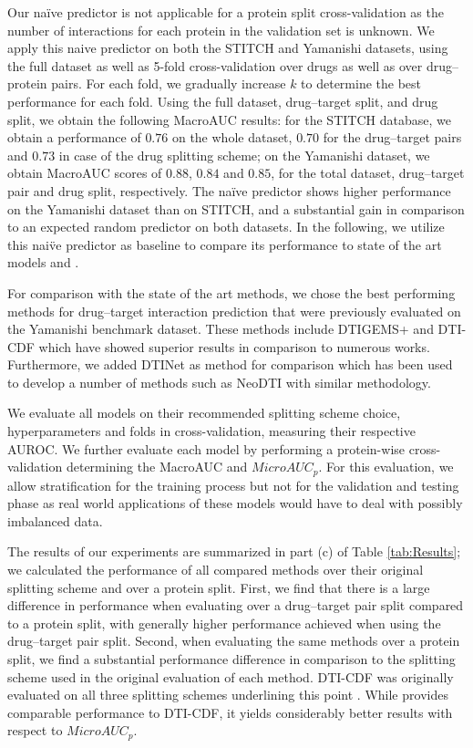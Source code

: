\documentclass{bioinfo}
\renewcommand{\cite}{\citep}
\begin{document}
Our na\"ive predictor is not applicable for a protein split
cross-validation as the number of interactions for each protein in the
validation set is unknown.  We apply this naive predictor on both the
STITCH and Yamanishi datasets, using the full dataset as well as
5-fold cross-validation over drugs as well as over drug--protein
pairs.  For each fold, we gradually increase $k$ to determine the best
performance for each fold. Using the full dataset, drug--target split,
and drug split, we obtain the following MacroAUC results: for the
STITCH database, we obtain a performance of $0.76$ on the whole
dataset, $0.70$ for the drug--target pairs and $0.73$ in case of the
drug splitting scheme; on the Yamanishi dataset, we obtain MacroAUC
scores of $0.88$, $0.84$ and $0.85$, for the total dataset,
drug--target pair and drug split, respectively.  The na\"ive predictor
shows higher performance on the Yamanishi dataset than on STITCH, and
a substantial gain in comparison to an expected random predictor on
both datasets. In the following, we utilize this nai\"ve predictor as
baseline to compare its performance to state of the art models and
\name.

For comparison with the state of the art methods, we chose the best
performing methods for drug--target interaction prediction that were
previously evaluated on the Yamanishi benchmark dataset. These methods
include DTIGEMS+ \cite{DTIGEMS2020} and DTI-CDF \cite{DTI-CDF2019}
which have showed superior results in comparison to numerous
works. Furthermore, we added DTINet \cite{DTINet2017} as method for
comparison which has been used to develop a number of methods such as
NeoDTI \cite{NeoDTI2019} with similar methodology.

We evaluate all models on their recommended splitting scheme choice,
hyperparameters and folds in cross-validation, measuring their
respective AUROC. We further evaluate each model by performing a
protein-wise cross-validation determining the MacroAUC and
$MicroAUC_p$. For this evaluation, we allow stratification for the
training process but not for the validation and testing phase as real
world applications of these models would have to deal with possibly
imbalanced data.

The results of our experiments are summarized in part (c) of Table
\ref{tab:Results}; we calculated the performance of all compared
methods over their original splitting scheme and over a protein
split. First, we find that there is a large difference in performance
when evaluating over a drug--target pair split compared to a
protein split, with generally higher performance achieved when using
the drug--target pair split.
Second, when evaluating the same methods over a protein split, we find
a substantial performance difference in comparison to the splitting
scheme used in the original evaluation of each method. DTI-CDF was
originally evaluated on all three splitting schemes underlining this
point \cite{}. While \name provides comparable performance to DTI-CDF,
it yields considerably better results with respect to $MicroAUC_p$.
\end{document}
